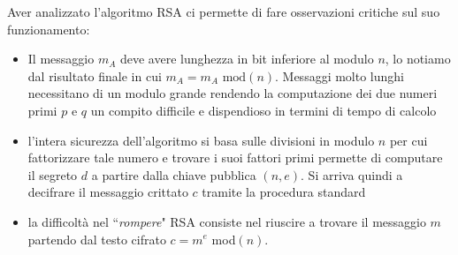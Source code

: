 \documentclass[a4paper,12pt]{tesiinfo}
\begin{document}
Aver analizzato l'algoritmo RSA ci permette di fare osservazioni critiche sul suo funzionamento:
\begin{itemize}
  \item Il messaggio $m_A$ deve avere lunghezza in bit inferiore al modulo $n$, lo notiamo dal risultato finale in cui $m_A = m_A \text{ mod}(n)$. Messaggi molto lunghi necessitano di un modulo grande rendendo la computazione dei due numeri primi $p$ e $q$ un compito difficile e dispendioso in termini di tempo di calcolo
  \item l'intera sicurezza dell'algoritmo si basa sulle divisioni in modulo $n$ per cui fattorizzare tale numero e trovare i suoi fattori primi permette di computare il segreto $d$ a partire dalla chiave pubblica $(n, e)$. Si arriva quindi a decifrare il messaggio crittato $c$ tramite la procedura standard
  \item la difficolt\`a nel ``\textit{rompere}" RSA consiste nel riuscire a trovare il messaggio $m$ partendo dal testo cifrato $c = m^e$ mod$(n)$. 
\end{itemize}
%
%
%
%
%
%
%
%
%
%
%
%
\end{document}
